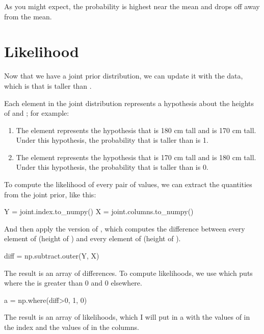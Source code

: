 \documentclass[12pt]{book}
\theoremstyle{exercise}
\begin{document}
As you might expect, the probability is highest near the mean and drops off away from the mean.


\section{Likelihood}

Now that we have a joint prior distribution, we can update it with the data, which is that  is taller than .

Each element in the joint distribution represents a hypothesis about the heights of  and ; for example:

\begin{enumerate}

\item The element  represents the hypothesis that  is 180 cm tall and  is 170 cm tall.  Under this hypothesis, the probability that  is taller than  is 1.

\item The element  represents the hypothesis that  is 170 cm tall and  is 180 cm tall.  Under this hypothesis, the probability that  is taller than  is 0.

\end{enumerate}

To compute the likelihood of every pair of values, we can extract the quantities from the joint prior, like this:

\begin{code}
Y = joint.index.to_numpy()
X = joint.columns.to_numpy()
\end{code}

And then apply the  version of , which computes the difference between every element of  (height of ) and every element of  (height of ).

\begin{code}
diff = np.subtract.outer(Y, X)
\end{code}

The result is an array of differences.  To compute likelihoods, we use  which puts  where the  is greater than 0 and 0 elsewhere.

\begin{code}
a = np.where(diff>0, 1, 0)
\end{code}

The result is an array of likelihoods, which I will put in a  with the values of  in the index and the values of  in the columns.
\end{document}
